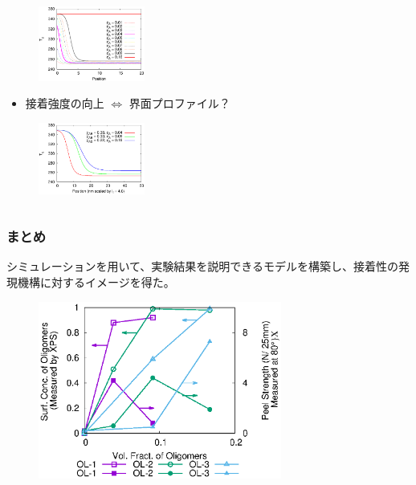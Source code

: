 \documentclass[unicode,12pt]{beamer}%
\begin{document}
\begin{frame}
\begin{columns}
\begin{column}{6.0cm}
{		\vspace{-1\baselineskip}
		\begin{figure}[htbp]
			\begin{center}
				\includegraphics[width=35mm]{A6_B600_Chi_03_chiS_0.0_Tg.eps}
			\end{center}
		\end{figure}

		\vspace{-1\baselineskip}
		\begin{itemize}
			\item 接着強度の向上 $\Leftrightarrow$ 界面プロファイル？
		\end{itemize}
		
		\vspace{-1\baselineskip}
		\begin{figure}[htbp]
			\begin{center}
				\includegraphics[width=35mm]{Tg.eps}
			\end{center}
		\end{figure}
	}
	\end{column}
\end{columns}

\end{frame}

\begin{frame}\frametitle{まとめ}

シミュレーションを用いて、実験結果を説明できる\color{red}モデルを構築\color{black}し、接着性の\color{red}発現機構に対するイメージ\color{black}を得た。

\vspace{-0.5\baselineskip}
\begin{figure}[!b]
	\begin{center}
		\includegraphics[width=80mm]{Exp_Data_color.eps}
	\end{center}
\end{figure}

\end{frame}
\end{document}
